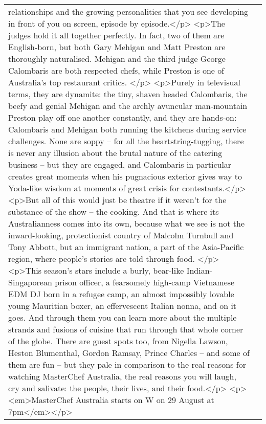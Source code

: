 \documentclass[]{article}
\begin{document}
\begin{table}[!h]
{\begin{tabular}[t]{ll}
relationships and the growing personalities that you see developing in front of you on screen, episode by episode.</p> <p>The judges hold it all together perfectly. In fact, two of them are English-born, but both Gary Mehigan and Matt Preston are thoroughly naturalised. Mehigan and the third judge George Calombaris are both respected chefs, while Preston is one of Australia’s top restaurant critics. </p> <p>Purely in televisual terms, they are dynamite: the tiny, shaven headed Calombaris, the beefy and genial Mehigan and the archly avuncular man-mountain Preston play off one another constantly, and they are hands-on: Calombaris and Mehigan both running the kitchens during service challenges. None are soppy – for all the heartstring-tugging, there is never any illusion about the brutal nature of the catering business – but they are engaged, and Calombaris in particular creates great moments when his pugnacious exterior gives way to Yoda-like wisdom at moments of great crisis for contestants.</p> <p>But all of this would just be theatre if it weren’t for the substance of the show – the cooking. And that is where its Australianness comes into its own, because what we see is not the inward-looking, protectionist country of Malcolm Turnbull and Tony Abbott, but an immigrant nation, a part of the Asia-Pacific region, where people’s stories are told through food. </p> <p>This season’s stars include a burly, bear-like Indian-Singaporean prison officer, a fearsomely high-camp Vietnamese EDM DJ born in a refugee camp, an almost impossibly lovable young Mauritian boxer, an effervescent Italian nonna, and on it goes. And through them you can learn more about the multiple strands and fusions of cuisine that run through that whole corner of the globe. There are guest spots too, from Nigella Lawson, Heston Blumenthal, Gordon Ramsay, Prince Charles – and some of them are fun – but they pale in comparison to the real reasons for watching MasterChef Australia, the real reasons you will laugh, cry and salivate: the people, their lives, and their food.</p> <p><em>MasterChef Australia starts on W on 29 August at 7pm</em></p>\\

\end{tabular}}
\end{table}
\end{document}
